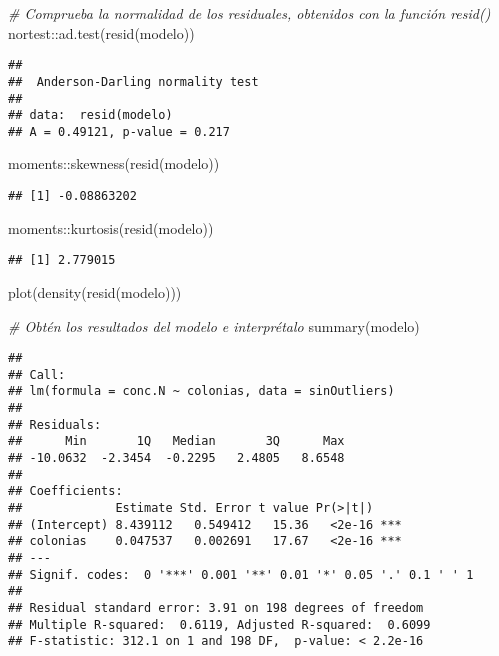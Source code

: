 \documentclass[
]{article}
\newenvironment{Shaded}{}{}
\newcommand{\CommentTok}[1]{\textcolor[rgb]{0.38,0.63,0.69}{\textit{#1}}}
\newcommand{\FunctionTok}[1]{\textcolor[rgb]{0.02,0.16,0.49}{#1}}
\newcommand{\NormalTok}[1]{#1}
\newcommand{\SpecialCharTok}[1]{\textcolor[rgb]{0.25,0.44,0.63}{#1}}
\begin{document}
\begin{Shaded}
\begin{Highlighting}[]
\CommentTok{\# Comprueba la normalidad de los residuales, obtenidos con la función resid()}
\NormalTok{nortest}\SpecialCharTok{::}\FunctionTok{ad.test}\NormalTok{(}\FunctionTok{resid}\NormalTok{(modelo))}
\end{Highlighting}
\end{Shaded}

\begin{verbatim}
## 
##  Anderson-Darling normality test
## 
## data:  resid(modelo)
## A = 0.49121, p-value = 0.217
\end{verbatim}

\begin{Shaded}
\begin{Highlighting}[]
\NormalTok{moments}\SpecialCharTok{::}\FunctionTok{skewness}\NormalTok{(}\FunctionTok{resid}\NormalTok{(modelo))}
\end{Highlighting}
\end{Shaded}

\begin{verbatim}
## [1] -0.08863202
\end{verbatim}

\begin{Shaded}
\begin{Highlighting}[]
\NormalTok{moments}\SpecialCharTok{::}\FunctionTok{kurtosis}\NormalTok{(}\FunctionTok{resid}\NormalTok{(modelo))}
\end{Highlighting}
\end{Shaded}

\begin{verbatim}
## [1] 2.779015
\end{verbatim}

\begin{Shaded}
\begin{Highlighting}[]
\FunctionTok{plot}\NormalTok{(}\FunctionTok{density}\NormalTok{(}\FunctionTok{resid}\NormalTok{(modelo)))}

\CommentTok{\# Obtén los resultados del modelo e interprétalo}
\FunctionTok{summary}\NormalTok{(modelo)}
\end{Highlighting}
\end{Shaded}

\begin{verbatim}
## 
## Call:
## lm(formula = conc.N ~ colonias, data = sinOutliers)
## 
## Residuals:
##      Min       1Q   Median       3Q      Max 
## -10.0632  -2.3454  -0.2295   2.4805   8.6548 
## 
## Coefficients:
##             Estimate Std. Error t value Pr(>|t|)    
## (Intercept) 8.439112   0.549412   15.36   <2e-16 ***
## colonias    0.047537   0.002691   17.67   <2e-16 ***
## ---
## Signif. codes:  0 '***' 0.001 '**' 0.01 '*' 0.05 '.' 0.1 ' ' 1
## 
## Residual standard error: 3.91 on 198 degrees of freedom
## Multiple R-squared:  0.6119, Adjusted R-squared:  0.6099 
## F-statistic: 312.1 on 1 and 198 DF,  p-value: < 2.2e-16
\end{verbatim}
\end{document}
